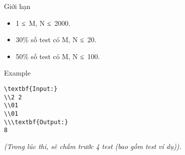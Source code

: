Giới hạn
\begin{itemize}
	\item     1 ≤ M, N ≤ 2000.   
	\item     30\% số test có M, N ≤ 20.   
	\item     50\% số test có M, N ≤ 100.   
\end{itemize}
\begin{itemize}
\end{itemize}
Example
\begin{verbatim}
\textbf{Input:}
\\2 2
\\01
\\01
\\\textbf{Output:}
8\end{verbatim}

\emph{    (Trong lúc thi, sẽ chấm trước 4 test (bao gồm test ví dụ)).   }